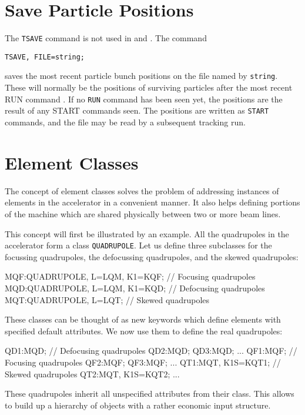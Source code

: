 \section{Save Particle Positions}
\label{sec:tracksave}
The \texttt{TSAVE} command is not used in \noopalt and \noopalcycl. The command
\begin{verbatim}
TSAVE, FILE=string;
\end{verbatim}
saves the most recent particle bunch positions on the file named by
\texttt{string}.
These will normally be the positions of surviving particles after the
most recent {RUN} command .
If no \texttt{RUN} command has been seen yet,
the positions are the result of any
{START} commands  seen.
The positions are written as \texttt{START} commands,
and the file may be read by a subsequent tracking run.


\section{Element Classes}
\label{sec:elm-class}
The concept of element classes solves the problem of addressing
instances of elements in the accelerator in a convenient manner.
It also helps defining portions of the machine which are shared
physically between two or more beam lines.

This concept will first be illustrated by an example.
All the quadrupoles in the accelerator form a class \texttt{QUADRUPOLE}.
Let us define three subclasses for the focussing quadrupoles,
the defocussing quadrupoles, and the skewed quadrupoles:
\begin{example}
MQF:QUADRUPOLE, L=LQM, K1=KQF; // Focusing quadrupoles
MQD:QUADRUPOLE, L=LQM, K1=KQD; // Defocusing quadrupoles
MQT:QUADRUPOLE, L=LQT;        // Skewed quadrupoles
\end{example}
These classes can be thought of as new keywords which define elements
with specified default attributes.
We now use them to define the real quadrupoles:
\begin{example}
QD1:MQD; // Defocusing quadrupoles
QD2:MQD;
QD3:MQD;
...
QF1:MQF; // Focusing quadrupoles
QF2:MQF;
QF3:MQF;
...
QT1:MQT, K1S=KQT1; // Skewed quadrupoles
QT2:MQT, K1S=KQT2;
...
\end{example}
These quadrupoles inherit all unspecified attributes from their class.
This allows to build up a hierarchy of objects with a rather
economic input structure.

